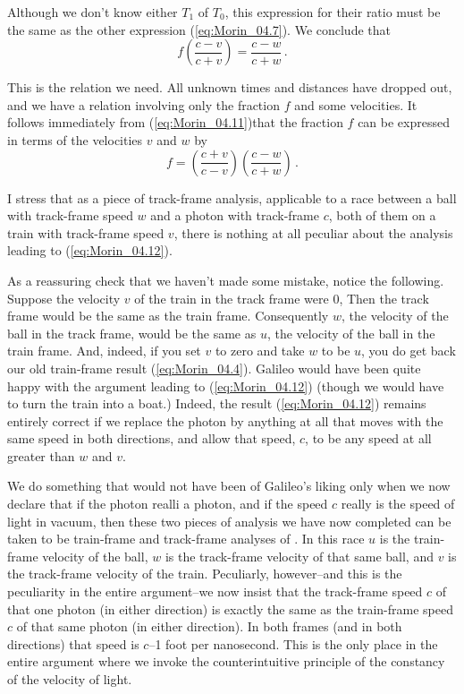 Although we don't know either $T_1$ of $T_0$, this expression for their ratio must be the same as the other expression (\ref{eq:Morin_04.7}). We conclude that 
\begin{equation}\label{eq:Morin_04.11}
f \left( \frac{c - v}{c + v}  \right) = \frac{c - w}{c + w} \,.
\end{equation}

This is the relation we need. All unknown times and distances have dropped out, and we have a relation involving only the fraction $f$ and some velocities. It follows immediately from (\ref{eq:Morin_04.11})that the fraction $f$ can be expressed in terms of the velocities $v$ and $w$ by
\begin{equation}\label{eq:Morin_04.12}
f = \left( \frac{c + v}{c - v} \right)\left( \frac{c - w}{c + w} \right) \,.
\end{equation}

I stress that as a piece of track-frame analysis, applicable to a race between a ball with track-frame speed $w$ and a photon with track-frame $c$, both of them on a train with track-frame speed $v$, there is nothing at all peculiar about the analysis leading to (\ref{eq:Morin_04.12}). 

As a reassuring check that we haven't made some mistake, notice the following. Suppose the velocity $v$ of the train in the track frame were $0$, Then the track frame would be the same as the train frame. Consequently $w$, the velocity of the ball in the track frame, would be the same as $u$, the velocity of the ball in the train frame. And, indeed, if you set $v$ to zero and take $w$ to be $u$, you do get back our old train-frame result (\ref{eq:Morin_04.4}). Galileo would have been quite happy with the argument leading to (\ref{eq:Morin_04.12}) (though we would have to turn the train into a boat.) Indeed, the result (\ref{eq:Morin_04.12}) remains entirely correct if we replace the photon by anything at all that moves with the same speed in both directions, and allow that speed, $c$, to be any speed at all greater than $w$ and $v$.

We do something that would not have been of Galileo's liking only when we now declare that if the photon realli  a photon, and if the speed $c$ really is the speed of light in vacuum, then these two pieces of analysis we have now completed can be taken to be train-frame and track-frame analyses of . In this race $u$ is the train-frame velocity of the ball, $w$ is the track-frame velocity of that same ball, and $v$ is the track-frame velocity of the train. Peculiarly, however--and this is the  peculiarity in the entire argument--we now insist that the track-frame speed $c$ of that one photon (in either direction) is exactly the same as the train-frame speed $c$ of that same photon (in either direction). In both frames (and in both directions) that speed is $c$--1 foot per nanosecond. This is the only place in the entire argument where we invoke the counterintuitive principle of the constancy of the velocity of light. 

